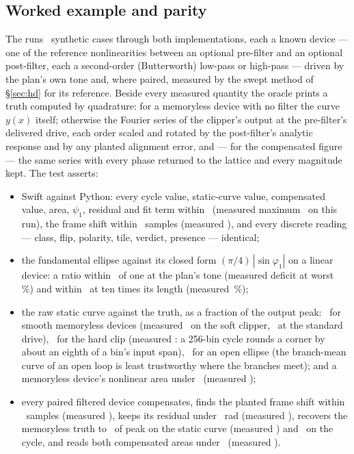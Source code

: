 \documentclass[11pt,a4paper]{article}
\begin{document}
\subsection{Worked example and parity}
\label{sec:transfer-example}


The  runs \tparityCaseCount\ synthetic cases through both
implementations, each a known device --- one of the reference
nonlinearities between an optional pre-filter and an optional post-filter,
each a second-order (Butterworth) low-pass or high-pass --- driven by the
plan's own tone and, where paired, measured by the swept method of
\S\ref{sec:hd} for its reference. Beside every measured quantity the
oracle prints a truth computed by quadrature: for a memoryless device with
no filter the curve $y(x)$ itself; otherwise the Fourier series of the
clipper's output at the pre-filter's delivered drive, each order scaled and
rotated by the post-filter's analytic response and by any planted
alignment error, and --- for the compensated figure --- the same series
with every phase returned to the lattice and every magnitude kept.
\machineFloorNote{} The test asserts:
{\sloppy
\begin{itemize}
  \item Swift against Python: every cycle value, static-curve value,
  compensated value, area, $\psi_1$, residual and fit term within
  \tparitySwift\ (measured maximum \tparityWorstSwift\ on this run), the
  frame shift within \tparitySwiftShift\ samples (measured
  \tparityWorstShift), and every discrete reading --- class, flip,
  polarity, tile, verdict, presence --- identical;
  \item the fundamental ellipse against its closed form
  $(\pi/4)\,|\sin\varphi_1|$ on a linear device: a ratio within
  \tparityEllipseRatio\ of one at the plan's tone (measured deficit at
  worst \tparityEllipseDeficitShort\,\%) and within
  \tparityEllipseRatioLong\ at ten times its length (measured
  \tparityEllipseDeficitLong\,\%);
  \item the raw static curve against the truth, as a fraction of the
  output peak: \tparityRawStaticSmooth\ for smooth memoryless devices
  (measured \tparityTanhStatic\ on the soft clipper, \tparityTanhPlanStatic\
  at the standard drive), \tparityRawStaticHardclip\ for the hard clip
  (measured \tparityHardclipStatic: a 256-bin cycle rounds a corner by
  about an eighth of a bin's input span), \tparityRawStaticEllipse\ for an
  open ellipse (the branch-mean curve of an open loop is least trustworthy
  where the branches meet); and a memoryless device's nonlinear area under
  \tparityMemorylessNonlinear\ (measured \tparityWorstMemorylessNonlinear);
  \item every paired filtered device compensates, finds the planted frame
  shift within \tparityFrameShift\ samples (measured \tparityWorstFrameShift),
  keeps its residual under \tparityResidual\ rad (measured
  \tparityWorstResidual), recovers the memoryless truth to
  \tparityCompStatic\ of peak on the static curve (measured
  \tparityWorstCompStatic) and \tparityCompCycle\ on the cycle, and reads
  both compensated areas under \tparityCompArea\ (measured
  \tparityWorstCompArea).
\end{itemize}
\par}
\end{document}
